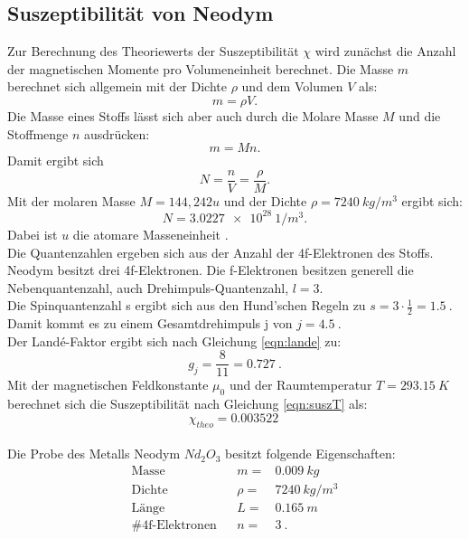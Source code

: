 \subsection{Suszeptibilität von Neodym}
Zur Berechnung des Theoriewerts der Suszeptibilität $\chi$ wird zunächst die Anzahl der magnetischen Momente pro Volumeneinheit berechnet.
Die Masse $m$ berechnet sich allgemein mit der Dichte $\rho$ und dem Volumen $V$ als:
\begin{equation*}
  m= \rho V.
\end{equation*}
Die Masse eines Stoffs lässt sich aber auch durch die Molare Masse $M$ und die Stoffmenge $n$ ausdrücken:
\begin{equation*}
  m= M n.
\end{equation*}
Damit ergibt sich
\begin{equation*}
  N= \frac{n}{V}=\frac{\rho}{M}.
\end{equation*}
Mit der molaren Masse $M= 144,242 u $ \cite{molm} und der Dichte $\rho = \SI{7240}{kg/m^3}$ ergibt sich:
\begin{equation*}
  N= \SI{3.0227e28}{1/m^3}.
\end{equation*}
Dabei ist $u$ die atomare Masseneinheit \cite{taschenrechner}.
\\Die Quantenzahlen ergeben sich aus der Anzahl der 4f-Elektronen des Stoffs.
Neodym besitzt drei 4f-Elektronen.
Die f-Elektronen besitzen generell die Nebenquantenzahl, auch Drehimpuls-Quantenzahl, $l=3$.
\\Die Spinquantenzahl s ergibt sich aus den Hund'schen Regeln zu $s= 3\cdot \frac{1}{2} = \SI{1.5}{}$.
\\Damit kommt es zu einem Gesamtdrehimpuls j von $j=\SI{4.5}{}$.
\\Der Landé-Faktor ergibt sich nach Gleichung \eqref{eqn:lande} zu:
\begin{equation*}
  g_j=\frac{8}{11}=\SI{0.727}{}.
\end{equation*}
Mit der magnetischen Feldkonstante $\mu_0$ \cite{taschenrechner} und der Raumtemperatur $T=\SI{293.15}{K}$ berechnet sich die Suszeptibilität nach Gleichung \eqref{eqn:suszT} als:
\begin{equation*}
  \chi_{theo}=\SI{0.003522}{}
\end{equation*}
\\Die Probe des Metalls Neodym $Nd_2 O_3$ besitzt folgende Eigenschaften:
\begin{align*}
  \text{Masse} && m=& \SI{0.009}{kg}   \\
  \text{Dichte} && \rho=& \SI{7240}{kg/m^3}   \\
  \text{Länge} && L=& \SI{0.165}{m}   \\
  \# \text{4f-Elektronen} && n=& \SI{3}{}.
\end{align*}
